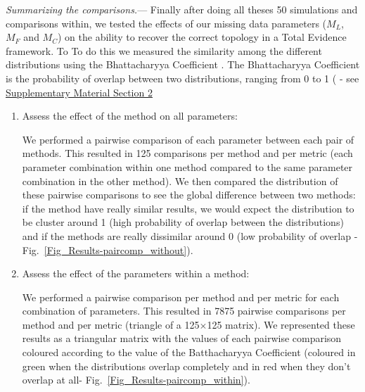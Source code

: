 \documentclass[12pt,letterpaper]{article}
\renewcommand{\subsubsection}[1]{%
\vspace{2ex}
\noindent
\textit{#1.}---}
\begin{document}
\subsubsection{Summarizing the comparisons}
Finally after doing all theses %
50 simulations and comparisons within, we tested the effects of our missing data parameters ($M_{L}$, $M_{F}$ and $M_{C}$) on the ability to recover the correct topology in a Total Evidence framework.
To
To do this we measured the similarity among the different distributions %
using the Bhattacharyya Coefficient \citep{Bhattacharyya}. The Bhattacharyya Coefficient is the probability of overlap between two distributions, ranging from 0 to 1 (\citealt{Bhattacharyya} - see \hyperref[SupplementaryMaterial]{Supplementary Material Section 2} %

\begin{enumerate}
\item{Assess the effect of the method on all parameters:}

We performed a pairwise comparison of each parameter between each pair of methods. This resulted in 125 comparisons per method and per metric (each parameter combination within one method compared to the same parameter combination in the other method). We then compared the distribution of these pairwise comparisons to see the global difference between two methods: if the method have really similar results, we would expect the distribution to be cluster around 1 (high probability of overlap between the distributions) and if the methods are really dissimilar around 0 (low probability of overlap - Fig.~\ref{Fig_Results-paircomp_without}).
\item{Assess the effect of the parameters within a method:}

We performed a pairwise comparison per method and per metric for each combination of parameters. This resulted in 7875 pairwise comparisons per method and per metric (triangle of a 125$\times$125 matrix). We represented these results as a triangular matrix with the values of each pairwise comparison coloured according to the value of the Batthacharyya Coefficient (coloured in green when the distributions overlap completely and in red when they don't overlap at all- Fig.~\ref{Fig_Results-paircomp_within}).
\end{enumerate}
\end{document}
